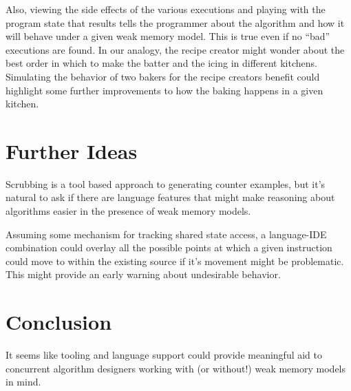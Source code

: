 \documentclass[9pt,twocolumn]{extarticle}
\begin{document}
Also, viewing the side effects of the various executions and playing with the program state that results tells the programmer about the algorithm and how it will behave under a given weak memory model. This is true even if no ``bad'' executions are found. In our analogy, the recipe creator might wonder about the best order in which to make the batter and the icing in different kitchens. Simulating the behavior of two bakers for the recipe creators benefit could highlight some further improvements to how the baking happens in a given kitchen.

\vspace{-0.25cm}
\section{Further Ideas}
\vspace{-0.25cm}

Scrubbing is a tool based approach to generating counter examples, but it's natural to ask if there are language features that might make reasoning about algorithms easier in the presence of weak memory models.

Assuming some mechanism for tracking shared state access, a language-IDE combination could overlay all the possible points at which a given instruction could move to within the existing source if it's movement might be problematic. This might provide an early warning about undesirable behavior.

\vspace{-0.25cm}
\section{Conclusion}
\vspace{-0.25cm}

It seems like tooling and language support could provide meaningful aid to concurrent algorithm designers working with (or without!) weak memory models in mind.
\end{document}
